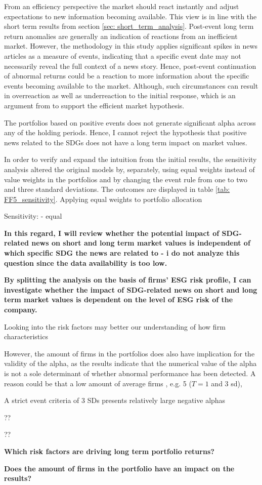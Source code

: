 From an efficiency perspective the market should react instantly and adjust expectations to new information becoming available. This view is in line with the short term results from section \ref{sec: short_term_analysis}. Post-event long term return anomalies are generally an indication of reactions from an inefficient market. However, the methodology in this study applies significant spikes in news articles as a measure of events, indicating that a specific event date may not necessarily reveal the full context of a news story. Hence, post-event continuation of abnormal returns could be a reaction to more information about the specific events becoming available to the market. Although, such circumstances can result in overreaction as well as underreaction to the initial response, which is an argument from \cite{fama1998_events} to support the efficient market hypothesis.   

The portfolios based on positive events does not generate significant alpha across any of the holding periods. Hence, I cannot reject the hypothesis that positive news related to the SDGs does not have a long term impact on market values. 



In order to verify and expand the intuition from the initial results, the sensitivity analysis altered the original models by, separately, using equal weights instead of value weights in the portfolios and by changing the event rule from one to two and three standard deviations. The outcomes are displayed in table \ref{tab: FF5_sensitivity}. Applying equal weights to portfolio allocation 



Sensitivity:
- equal

\textbf{In this regard, I will review
whether the potential impact of SDG-related news on short and long term market values
is independent of which specific SDG the news are related to - i do not analyze this question since the data availability is too low.}



\textbf{By splitting the analysis on the basis of firms’
ESG risk profile, I can investigate whether the impact of SDG-related news on short and
long term market values is dependent on the level of ESG risk of the company.}

Looking into the risk factors  may better our understanding of how firm characteristics 


However, the amount of firms in the portfolios does also have implication for the validity of the alpha, as the results indicate that the numerical value of the alpha is not a sole determinant of whether abnormal performance has been detected. A reason could be that a low amount of average firms , e.g. 5 ($T = 1$ and 3 sd), 

A strict event criteria of 3 SDs presents relatively large negative alphas

  ??

??






\textbf{Which risk factors are driving long term portfolio returns?}


\textbf{Does the amount of firms in the portfolio have an impact on the results?}
